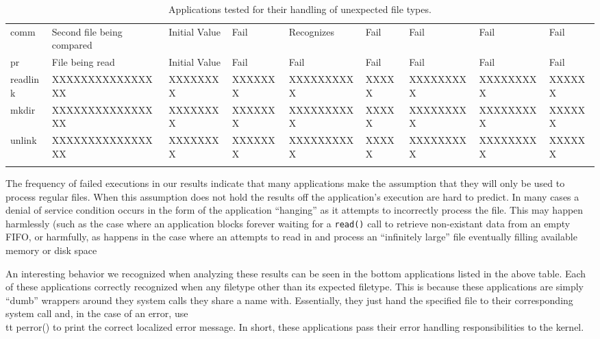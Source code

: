 \begin{table}[t]
\begin{tabular}{l  l  |  l  l  l  l  l  l  l}
        comm        & Second file being compared & Initial Value  & Fail           & Recognizes  & Fail       & Fail        & Fail       & Fail\\
        pr          & File being read            & Initial Value  & Fail           & Fail        & Fail       & Fail        & Fail       & Fail\\
        readlink    & XXXXXXXXXXXXXXXX           & XXXXXXXX       & XXXXXXX        & XXXXXXXXXX  & XXXXX      & XXXXXXXXX   & XXXXXXXXX  & XXXXXX\\
        mkdir       & XXXXXXXXXXXXXXXX           & XXXXXXXX       & XXXXXXX        & XXXXXXXXXX  & XXXXX      & XXXXXXXXX   & XXXXXXXXX  & XXXXXX\\
        unlink      & XXXXXXXXXXXXXXXX           & XXXXXXXX       & XXXXXXX        & XXXXXXXXXX  & XXXXX      & XXXXXXXXX   & XXXXXXXXX  & XXXXXX\\
    \bottomrule{}
    \end{tabular}
    \caption{Applications tested for their handling of unexpected file types.
}
    \label{table:unexpectedtypes}
\end{table}

The frequency of failed executions in our results indicate that many
applications make the assumption that they will only be used to process
regular files.  When this assumption does not hold the results off the
application's execution are hard to predict.  In many cases a denial of
service condition occurs in the form of the application ``hanging'' as it
attempts to incorrectly process the file.  This may happen harmlessly (such
as the case where an application blocks forever waiting for a {\tt read()}
call to retrieve non-existant data from an empty FIFO, or harmfully, as
happens in the case where an attempts to read in and process an
``infinitely large'' file eventually filling available memory or disk
space\cite{AptYumEndless} 


An interesting behavior we recognized when analyzing these results can be seen
in the bottom applications listed in the above table.  Each of these
applications correctly recognized when any filetype other than its expected
filetype.  This is because these applications are simply ``dumb'' wrappers
around they system calls they share a name with.  Essentially, they just hand
the specified file to their corresponding system call and, in the case of an
error, use {\\tt perror()} to print the correct localized error message.  In
short, these applications pass their error handling responsibilities to the
kernel.

